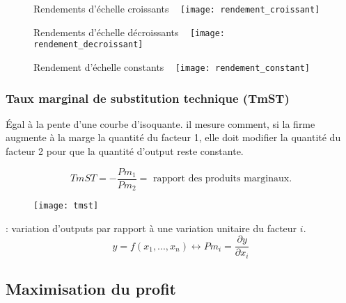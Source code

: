 \begin{minipage}{0.33\textwidth}
	\begin{figure}[H]
		\centering
		Rendements d'échelle croissants
		~
		\texttt{[image: rendement\_croissant]}
	\end{figure}
\end{minipage}
\begin{minipage}{0.33\textwidth}
	\begin{figure}[H]
		\centering
		Rendements d'échelle décroissants
		~
		\texttt{[image: rendement\_decroissant]}
	\end{figure}
\end{minipage}
\begin{minipage}{0.33\textwidth}
	\begin{figure}[H]
		\centering
		Rendement d'échelle constants
		~
		\texttt{[image: rendement\_constant]}
	\end{figure}
\end{minipage}

\subsubsection{Taux marginal de substitution technique (TmST)}

Égal à la pente d'une courbe d'isoquante. il mesure comment, si la firme augmente à la marge la quantité du facteur 1, elle doit modifier la quantité du facteur 2 pour que la quantité d'output reste constante.

\begin{equation*}
TmST = - \frac{Pm_1}{Pm_2} = \text{ rapport des produits marginaux.}
\end{equation*}

\begin{figure}[H]
	\centering
	\texttt{[image: tmst]}
\end{figure}

 : variation d'outputs par rapport à une variation unitaire du facteur $i$.
\begin{equation*}
y = f(x_1, ..., x_n) \leftrightarrow Pm_i = \frac{\partial y}{\partial x_i}
\end{equation*}

\subsection{Maximisation du profit}

